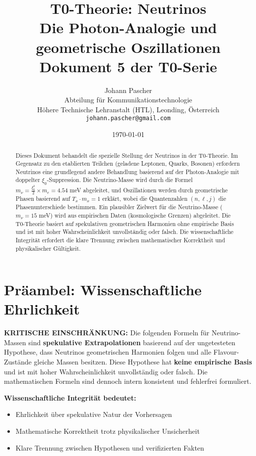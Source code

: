 \documentclass[12pt,a4paper]{article}
\title{\textbf{T0-Theorie: Neutrinos}\\[0.5cm]
	\large Die Photon-Analogie und geometrische Oszillationen\\[0.3cm]
	\normalsize Dokument 5 der T0-Serie}
\author{Johann Pascher\\
	Abteilung für Kommunikationstechnologie\\
	Höhere Technische Lehranstalt (HTL), Leonding, Österreich\\
	\texttt{johann.pascher@gmail.com}}
\date{\today}
\begin{document}
	
	\maketitle
	
	\begin{abstract}
		Dieses Dokument behandelt die spezielle Stellung der Neutrinos in der T0-Theorie. Im Gegensatz zu den etablierten Teilchen (geladene Leptonen, Quarks, Bosonen) erfordern Neutrinos eine grundlegend andere Behandlung basierend auf der Photon-Analogie mit doppelter $\xi_0$-Suppression. Die Neutrino-Masse wird durch die Formel $m_\nu = \frac{\xi_0^2}{2} \times m_e = 4.54$ meV abgeleitet, und Oszillationen werden durch geometrische Phasen basierend auf $T_x \cdot m_x = 1$ erklärt, wobei die Quantenzahlen $(n, \ell, j)$ die Phasenunterschiede bestimmen. Ein plausibler Zielwert für die Neutrino-Masse ($m_\nu = 15$ meV) wird aus empirischen Daten (kosmologische Grenzen) abgeleitet. Die T0-Theorie basiert auf spekulativen geometrischen Harmonien ohne empirische Basis und ist mit hoher Wahrscheinlichkeit unvollständig oder falsch. Die wissenschaftliche Integrität erfordert die klare Trennung zwischen mathematischer Korrektheit und physikalischer Gültigkeit.
	\end{abstract}
	
	\tableofcontents
	\newpage
	
	\section{Präambel: Wissenschaftliche Ehrlichkeit}
	
	\begin{warning}
		\textbf{KRITISCHE EINSCHRÄNKUNG:} Die folgenden Formeln für Neutrino-Massen sind \textbf{spekulative Extrapolationen} basierend auf der ungetesteten Hypothese, dass Neutrinos geometrischen Harmonien folgen und alle Flavour-Zustände gleiche Massen besitzen. Diese Hypothese hat \textbf{keine empirische Basis} und ist mit hoher Wahrscheinlichkeit unvollständig oder falsch. Die mathematischen Formeln sind dennoch intern konsistent und fehlerfrei formuliert.
		
		\vspace{0.5cm}
		\textbf{Wissenschaftliche Integrität bedeutet:}
		\begin{itemize}
			\item Ehrlichkeit über spekulative Natur der Vorhersagen
			\item Mathematische Korrektheit trotz physikalischer Unsicherheit
			\item Klare Trennung zwischen Hypothesen und verifizierten Fakten
		\end{itemize}
	\end{warning}
	
\end{document}
